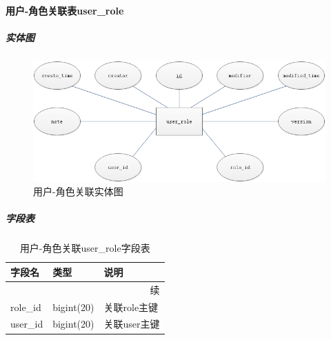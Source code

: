 \documentclass[titlepage,UTF8,linespread=1.5]{ctexart}
\begin{document}
\paragraph{用户-角色关联表user\_role}
\subparagraph{实体图}
\begin{figure}[H]
    \centering
    \includegraphics[width=140mm]{entity-user-role.png}
    \caption{用户-角色关联实体图}
    \label{fig:entity-user-role}
\end{figure}
\subparagraph{字段表}
\begin{longtable}{|p{10em}|p{6em}|p{15em}|}
    \caption{用户-角色关联user\_role字段表}\label{tab:table_user_role} \\\hline
    字段名         & 类型         & 说明                               \\\hline
    \endfirsthead
    \multicolumn{3}{r}{{续\tablename\thetable{}}}                      \\\hline
    \endhead
    role\_id       & bigint(20)   & 关联role主键                       \\\hline
    user\_id       & bigint(20)   & 关联user主键                       \\\hline
\end{longtable}\par
\end{document}
